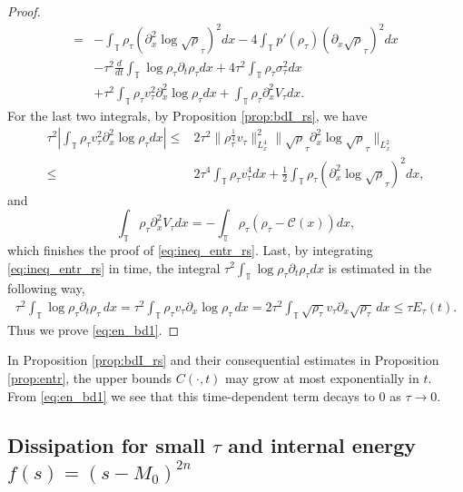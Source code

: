 \documentclass[leqno]{amsart}
\theoremstyle{plain}
\theoremstyle{definition}
\theoremstyle{remark}
\theoremstyle{plain}
\theoremstyle{plain}
\def\T{{\mathbb T}}%
\def\d{{\partial}}
\numberwithin{equation}{section}
\begin{document}
\begin{proof}
\begin{align*}
=&-\int_\T\rho_\tau(\d_x^2\log\sqrt\rho_\tau)^2 dx-4\int_\T p'(\rho_\tau)(\d_x\sqrt\rho_\tau)^2dx\\
&-\tau^2\frac{d}{dt}\int_\T\log\rho_\tau\d_t\rho_\tau dx+4\tau^2\int_\T\rho_\tau\sigma_\tau^2 dx\\
&+\tau^2\int_\T\rho_\tau v_\tau^2\d_x^2\log\rho_\tau dx+\int_\T\rho_\tau\d_x^2V_\tau dx.
\end{align*}
For the last two integrals, by Proposition \ref{prop:bdI_rs}, we have
\begin{align*}
\tau^2\left|\int_\T\rho_\tau v_\tau^2\d_x^2\log\rho_\tau dx\right|\leq& 2\tau^2\|\rho_\tau^\frac14 v_\tau\|_{L^4_x}^2\|\sqrt\rho_\tau\d_x^2\log\sqrt\rho_\tau\|_{L^2_x}\\
\leq &2\tau^4\int_\T \rho_\tau v_\tau^4dx+\frac12\int_\T\rho_\tau(\d_x^2\log\sqrt\rho_\tau)^2dx,
\end{align*}
and
\[
\int_\T\rho_\tau\d_x^2V_\tau dx=-\int_\T\rho_\tau(\rho_\tau-\mathcal{C}(x))dx,
\]
which finishes the proof of \eqref{eq:ineq_entr_rs}. Last, by integrating \eqref{eq:ineq_entr_rs} in time, the integral $\tau^2\int_\T\log\rho_\tau\d_t\rho_\tau dx$ is estimated in the following way,
\begin{equation*}\begin{aligned}
\tau^2\int_\T\log\rho_\tau\d_t\rho_\tau\,dx
=\tau^2\int_\T \rho_\tau v_\tau\d_x\log\rho_\tau\,dx
=2\tau^2\int_\T\sqrt{\rho_\tau}v_\tau\d_x\sqrt{\rho_\tau}\,dx
\leq\tau E_\tau(t).
\end{aligned}\end{equation*}
Thus we prove \eqref{eq:en_bd1}.
\end{proof}


In Proposition \ref{prop:bdI_rs} and their consequential estimates in Proposition \ref{prop:entr}, the upper bounds $C(\cdot,t)$ may grow at most exponentially in $t$. From \eqref{eq:en_bd1} we see that this time-dependent term decays to $0$ as $\tau\to 0$.

\subsection{Dissipation for small $\tau$ and internal energy $f(s)=(s-M_0)^{2n}$}\label{sect:disp}
\end{document}
